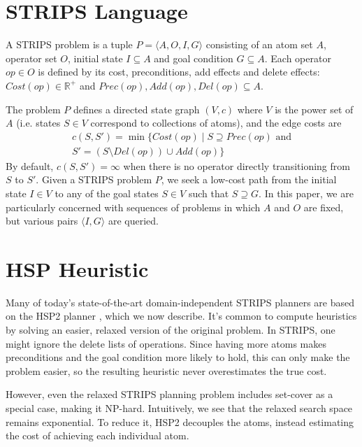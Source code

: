 \documentclass[letterpaper]{article}
\begin{document}
\section{STRIPS Language}

A STRIPS problem is a tuple $P = \langle A,O,I,G\rangle$ consisting of an atom set $A$, operator set $O$, initial state $I \subseteq A$ and goal condition $G \subseteq A$.
Each operator $op\in O$ is defined by its cost, preconditions, add effects and delete effects: $Cost(op) \in \mathbb{R}^+$ and $Prec(op),Add(op),Del(op) \subseteq A$.

The problem $P$ defines a directed state graph $(V,c)$ where $V$ is the power set of $A$ (i.e. states $S\in V$ correspond to collections of atoms), and the edge costs are
\begin{eqnarray*} c(S,S') = \min\{Cost(op) \mid S\supseteq Prec(op)\text{ and}
\\S' = \left(S \setminus Del(op)\right) \cup Add(op)\} \end{eqnarray*}
By default, $c(S,S') = \infty$ when there is no operator directly transitioning from $S$ to $S'$.
Given a STRIPS problem $P$, we seek a low-cost path from the initial state $I\in V$ to any of the goal states $S\in V$ such that $S \supseteq G$. In this paper, we are particularly concerned with sequences of problems in which $A$ and $O$ are fixed, but various pairs $\langle I,G\rangle$ are queried.

\section{HSP Heuristic}

Many of today's state-of-the-art domain-independent STRIPS planners are based on the HSP2 planner \cite{bonet2001planning}, which we now describe.
It's common to compute heuristics by solving an easier, relaxed version of the original problem. In STRIPS, one might ignore the delete lists of operations.
Since having more atoms makes preconditions and the goal condition more likely to hold, this can only make the problem easier, so the resulting heuristic never overestimates the true cost.

However, even the relaxed STRIPS planning problem includes set-cover as a special case, making it NP-hard.
Intuitively, we see that the relaxed search space remains exponential.
To reduce it, HSP2 decouples the atoms, instead estimating the cost of achieving each individual atom.
\end{document}
